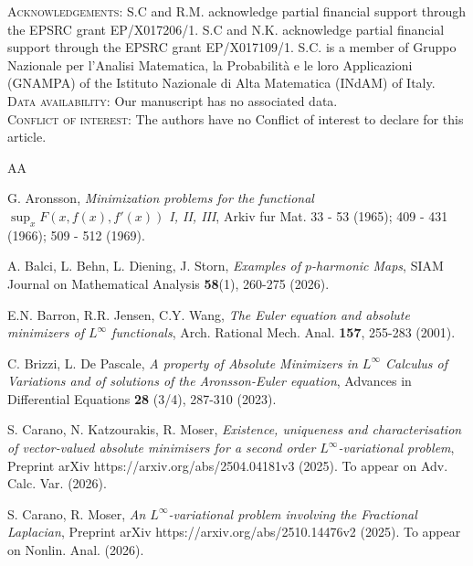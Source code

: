 \documentclass[a4paper,11pt]{article}
\numberwithin{equation}{section}
\theoremstyle{definition}
\begin{document}
\textsc{Acknowledgements:} S.C and R.M. acknowledge partial financial support through the EPSRC grant EP/X017206/1. S.C and N.K. acknowledge partial financial support through the EPSRC grant EP/X017109/1. 
S.C. is a member of Gruppo Nazionale per
l’Analisi Matematica, la Probabilità e le loro Applicazioni (GNAMPA) of the Istituto Nazionale
di Alta Matematica (INdAM) of Italy.\\

\textsc{Data availability}: Our manuscript has no associated data.\\

\textsc{Conflict of interest}: The authors have no Conflict of interest to declare for this article.

\begin{thebibliography}{AA} 

G. Aronsson, {\it Minimization problems for the functional $\sup_xF(x, f(x), f'(x))$ I, II, III}, Arkiv
fur Mat. 33 - 53 (1965); 409 - 431 (1966); 509 - 512 (1969).

{A. Balci, L. Behn, L. Diening, J. Storn,} {\it {Examples of \({p}\)-harmonic Maps}}, {SIAM Journal on Mathematical Analysis} {\bf 58}(1), 260-275 (2026).

E.N. Barron, R.R. Jensen, C.Y. Wang, {\it The Euler equation and absolute minimizers of $L^\infty$ functionals}, Arch. Rational
Mech. Anal. {\bf 157}, 255-283 (2001).


 C. Brizzi, L. De Pascale, \emph{A property of Absolute Minimizers in $ L^{\infty}$  Calculus of Variations and of solutions of the Aronsson-Euler equation}, Advances in Differential Equations {\bf 28} (3/4), 287-310 (2023).

S. Carano, N. Katzourakis, R. Moser, \emph{
Existence, uniqueness and characterisation of vector-valued absolute minimisers for a second order $L^\infty$-variational problem}, Preprint arXiv https://arxiv.org/abs/2504.04181v3 (2025). To appear on Adv. Calc. Var. (2026).

S. Carano, R. Moser, \emph{
An $L^\infty$-variational problem involving the Fractional Laplacian}, Preprint arXiv https://arxiv.org/abs/2510.14476v2 (2025). To appear on Nonlin. Anal. (2026).



\end{thebibliography}
\end{document}
